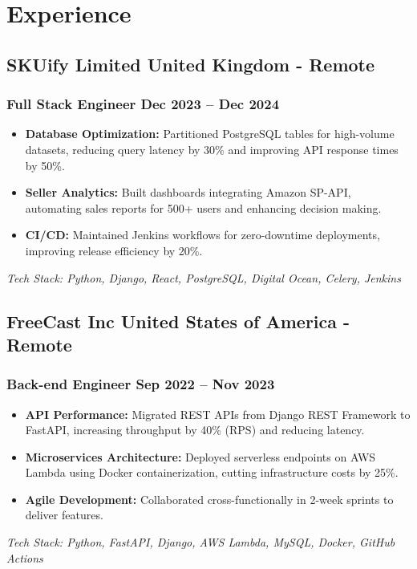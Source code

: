\documentclass[11pt]{article} %
\newcommand \techstack [1]
    {\small\textit{Tech Stack: {#1}}} %
\begin{document}
\section{Experience}

\subsection{SKUify Limited \hfill United Kingdom - Remote}
\subsubsection{Full Stack Engineer \hfill  Dec 2023 -- Dec 2024}
\begin{itemize}
    \item \textbf{Database Optimization:} Partitioned PostgreSQL tables for high-volume datasets, reducing query latency by 30\% and improving API response times by 50\%.
    \item \textbf{Seller Analytics:} Built dashboards integrating Amazon SP-API, automating sales reports for 500+ users and enhancing decision making.
    \item \textbf{CI/CD:} Maintained Jenkins workflows for zero-downtime deployments, improving release efficiency by 20\%.
\end{itemize}
\techstack{Python, Django, React, PostgreSQL, Digital Ocean, Celery, Jenkins}


\subsection{FreeCast Inc \hfill United States of America - Remote}
\subsubsection{Back-end Engineer \hfill  Sep 2022 -- Nov 2023}
\begin{itemize}
    \item \textbf {API Performance:} Migrated REST APIs from Django REST Framework to FastAPI, increasing throughput by 40\% (RPS) and reducing latency.
    \item \textbf {Microservices Architecture:} Deployed serverless endpoints on AWS Lambda using Docker containerization, cutting infrastructure costs by 25\%.
    \item \textbf {Agile Development:} Collaborated cross-functionally in 2-week sprints to deliver features.
\end{itemize}
\techstack{Python, FastAPI, Django, AWS Lambda, MySQL, Docker, GitHub Actions}
\end{document}
